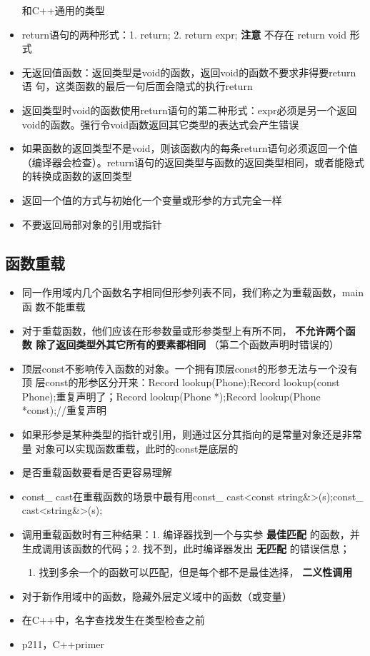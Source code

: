 \documentclass[11pt]{article}
\begin{document}
\begin{itemize}
和C++通用的类型
\item return语句的两种形式：1. return; 2. return expr; \textbf{注意} 不存在 return
void 形式
\item 无返回值函数：返回类型是void的函数，返回void的函数不要求非得要return语
句，这类函数的最后一句后面会隐式的执行return
\item 返回类型时void的函数使用return语句的第二种形式：expr必须是另一个返回
void的函数。强行令void函数返回其它类型的表达式会产生错误
\item 如果函数的返回类型不是void，则该函数内的每条return语句必须返回一个值
（编译器会检查）。return语句的返回类型与函数的返回类型相同，或者能隐式
的转换成函数的返回类型
\item 返回一个值的方式与初始化一个变量或形参的方式完全一样
\item 不要返回局部对象的引用或指针
\end{itemize}

\subsection{函数重载}
\label{sec-4-2}
\begin{itemize}
\item 同一作用域内几个函数名字相同但形参列表不同，我们称之为重载函数，main函
数不能重载
\item 对于重载函数，他们应该在形参数量或形参类型上有所不同， \textbf{不允许两个函数
除了返回类型外其它所有的要素都相同} （第二个函数声明时错误的）
\item 顶层const不影响传入函数的对象。一个拥有顶层const的形参无法与一个没有顶
层const的形参区分开来：Record lookup(Phone);Record lookup(const
Phone);重复声明了；Record lookup(Phone *);Record lookup(Phone
*const);//重复声明
\item 如果形参是某种类型的指针或引用，则通过区分其指向的是常量对象还是非常量
对象可以实现函数重载，此时的const是底层的
\item 是否重载函数要看是否更容易理解
\item const\_ cast在重载函数的场景中最有用const\_ cast<const
string\&>(s);const\_ cast<string\&>(s);
\item 调用重载函数时有三种结果：1. 编译器找到一个与实参 \textbf{最佳匹配} 的函数，并
生成调用该函数的代码；2. 找不到，此时编译器发出 \textbf{无匹配} 的错误信息；
\begin{enumerate}
\item 找到多余一个的函数可以匹配，但是每个都不是最佳选择， \textbf{二义性调用}
\end{enumerate}
\item 对于新作用域中的函数，隐藏外层定义域中的函数（或变量）
\item 在C++中，名字查找发生在类型检查之前
\item p211，C++primer
\end{itemize}
\end{document}
